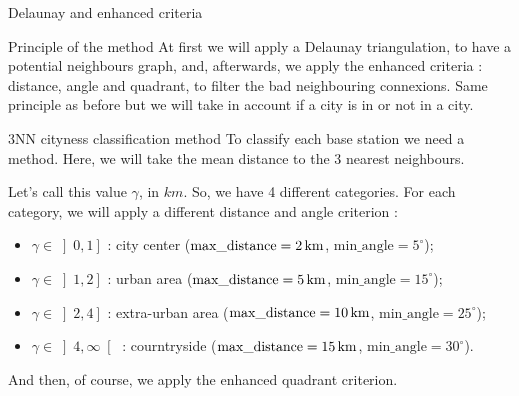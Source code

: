 \begin{frame}{Delaunay and enhanced criteria}
    \begin{block}{Principle of the method}
        At first we will apply a Delaunay triangulation, to have a potential neighbours graph, and, afterwards, we apply the enhanced criteria : distance, angle and quadrant,
        to filter the bad neighbouring connexions. Same principle as before but we will take in account if a city is in or not in a city.
    \end{block}

    \begin{block}{3NN cityness classification method}
        To classify each base station we need a method. Here, we will take the mean distance to the 3 nearest neighbours.

        Let's call this value $\gamma$, in $\unit{km}$. So, we have 4 different categories.
        For each category, we will apply a different distance and angle criterion :
        \begin{itemize}
            \item $\gamma\in\left]0, 1\right]$ : city center ($\text{max\_distance}=\unit[2]{km}$, $\text{min\_angle}=5^\circ$);
            \item $\gamma\in\left]1, 2\right]$ : urban area ($\text{max\_distance}=\unit[5]{km}$, $\text{min\_angle}=15^\circ$);
            \item $\gamma\in\left]2, 4\right]$ : extra-urban area ($\text{max\_distance}=\unit[10]{km}$, $\text{min\_angle}=25^\circ$);
            \item $\gamma\in\left]4, \infty\right[$ : courntryside ($\text{max\_distance}=\unit[15]{km}$, $\text{min\_angle}=30^\circ$).
        \end{itemize}
    \end{block}

    And then, of course, we apply the enhanced quadrant criterion.
\end{frame}


